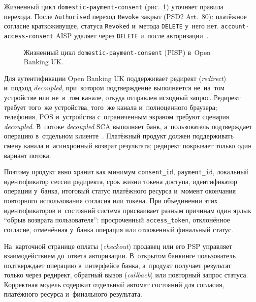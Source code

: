 Жизненный цикл \texttt{domestic-payment-consent}
(рис.~\ref{fig:consent-lifecycle}) уточняет правила перехода. После
\texttt{Authorised} переход \texttt{Revoke} закрыт (PSD2 Art.~80): платёжное
согласие краткоживущее, статуса \texttt{Revoked} и~метода \texttt{DELETE}
у~него нет. \texttt{account-access-consent} AISP удаляет через \texttt{DELETE}
и~после авторизации~\cite{openbanking-uk-domestic-payment-consents,openbanking-uk-account-access-consents}.

\begin{figure}[htbp]
  \centering
  \caption{Жизненный цикл \texttt{domestic-payment-consent} (PISP)
  в~Open Banking UK.}\label{fig:consent-lifecycle}
\end{figure}

Для аутентификации Open Banking UK поддерживает редирект (\textit{redirect})
и~подход \textit{decoupled}, при~котором подтверждение выполняется не~на~том
устройстве или не~в~том канале, откуда отправлен исходный запрос. Редирект требует того~же
устройства, того~же канала и~полноценного браузера; телефония, POS и~устройства
с~ограниченным экраном требуют сценария \textit{decoupled}. В~потоке
\textit{decoupled} SCA выполняет банк, а~пользователь подтверждает операцию
в~отдельном клиенте~\cite{openbanking-uk-authentication-methods}.
Платёжный продукт должен поддерживать смену канала и~асинхронный возврат
результата; редирект покрывает только один вариант потока.

Поэтому продукт явно хранит как минимум
\texttt{consent\_id}, \texttt{payment\_id}, локальный идентификатор сессии
редиректа, срок жизни токена доступа, идентификатор операции у~банка, итоговый
статус платёжного ресурса и~момент окончания повторного использования согласия
или токена. При объединении этих идентификаторов и~состояний система присваивает
разным причинам один ярлык \enquote{обрыв возврата пользователя}: просроченный
\texttt{access\_token}, отклонённое согласие, отменённая у~банка операция или
отложенный финальный статус.

На~карточной странице оплаты (\textit{checkout}) продавец или его PSP управляет
взаимодействием до~ответа авторизации. В~открытом банкинге
пользователь подтверждает операцию в~интерфейсе банка, а~продукт получает результат
только через редирект, обратный вызов (\textit{callback}) или повторный запрос
статуса. Корректная модель содержит отдельный автомат состояний для согласия,
платёжного ресурса и~финального результата.

